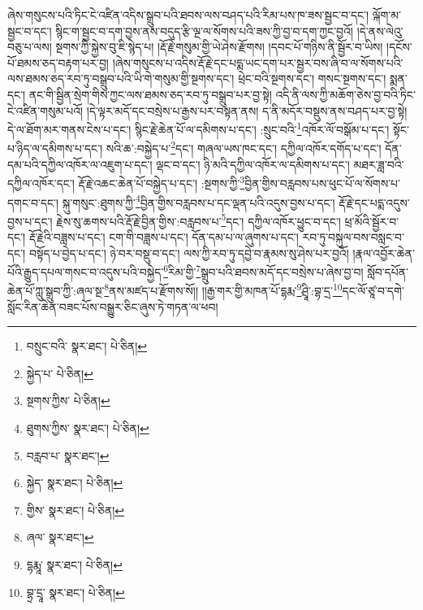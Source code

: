ཞེས་གསུངས་པའི་ཏིང་ངེ་འཛིན་འདིས་སྒྲུབ་པའི་ཐབས་ལས་བཤད་པའི་རིམ་པས་ཁ་ཟས་སྦྱང་བ་དང་། ལྐོག་མ་སྦྱང་བ་དང་། སྙིང་ག་སྦྱང་བ་དག་བྱས་ནས་བདུད་རྩི་ལྔ་ལ་སོགས་པའི་ཟས་ཀྱི་བྱ་བ་དག་ཀྱང་བྱའོ། །དེ་ནས་ལེའུ་བཅུ་པ་ལས། སྔགས་ཀྱི་སྐྱེས་བུ་ཇི་སྙེད་པ། །རྡོ་རྗེ་གསུམ་གྱི་ཡེ་ཤེས་རྫོགས། །དབང་པོ་གཉིས་ནི་སྦྱོར་བ་ཡིས། །དངོས་པོ་ཐམས་ཅད་བརྟག་པར་བྱ། །ཞེས་གསུངས་པ་འདིས་རྡོ་རྗེ་དང་པདྨ་ཡང་དག་པར་སྦྱར་བས་ཞི་བ་ལ་སོགས་པའི་ལས་ཐམས་ཅད་རབ་ཏུ་བསྒྲུབ་པའི་ཡི་གེ་གསུམ་གྱི་སྔགས་དང་། ཕྲེང་བའི་སྔགས་དང་། གསང་སྔགས་དང་། སྨན་དང་། ནང་གི་སྦྱིན་སྲེག་གིས་ཀྱང་ལས་ཐམས་ཅད་རབ་ཏུ་བསྒྲུབ་པར་བྱ་སྟེ། འདི་ནི་ལས་ཀྱི་མཆོག་ཅེས་བྱ་བའི་ཏིང་ངེ་འཛིན་གསུམ་པའོ། །དེ་ལྟར་མདོ་དང་བསྲེས་པ་རྒྱས་པར་བསྟན་ནས། ད་ནི་མདོར་བསྡུས་ནས་བཤད་པར་བྱ་སྟེ། དེ་ལ་ཐོག་མར་གནས་ངེས་པ་དང་། སྙིང་རྗེ་ཆེན་པོ་ལ་དམིགས་པ་དང་། :སྲུང་བའི་\footnote{བསྲུང་བའི་  སྣར་ཐང་།  པེ་ཅིན། }འཁོར་ལོ་བསྒོམ་པ་དང་། སྟོང་པ་ཉིད་ལ་དམིགས་པ་དང་། སའི་ཆ་:བསྐྱེད་པ་\footnote{སྐྱེད་པ་  པེ་ཅིན། }དང་། གཞལ་ཡས་ཁང་དང་། དཀྱིལ་འཁོར་དགོད་པ་དང་། དོན་དམ་པའི་དཀྱིལ་འཁོར་ལ་འཇུག་པ་དང་། ལྡང་བ་དང་། ཉི་མའི་དཀྱིལ་འཁོར་ལ་དམིགས་པ་དང་། མཐར་ཟླ་བའི་དཀྱིལ་འཁོར་དང་། རྡོ་རྗེ་འཆང་ཆེན་པོ་བསྐྱེད་པ་དང་། :སྔགས་ཀྱི་\footnote{སྔགས་ཀྱིས་  པེ་ཅིན། }བྱིན་གྱིས་བརླབས་པས་ཕུང་པོ་ལ་སོགས་པ་དགང་བ་དང་། སྐུ་གསུང་:ཐུགས་ཀྱི་\footnote{ཐུགས་ཀྱིས་  སྣར་ཐང་།  པེ་ཅིན། }བྱིན་གྱིས་བརླབས་པ་དང་ལྡན་པའི་འདུས་བྱས་པ་དང་། རྡོ་རྗེ་དང་པདྨ་འདུས་བྱས་པ་དང་། རྗེས་སུ་ཆགས་པའི་རྡོ་རྗེ་བྱིན་གྱིས་:བརླབས་པ་\footnote{བརླབ་པ་  སྣར་ཐང་། }དང་། དཀྱིལ་འཁོར་ཕྱུང་བ་དང་། ཕྲ་མོའི་སྦྱོར་བ་དང་། རྡོ་རྗེའི་བཟླས་པ་དང་། ངག་གི་བཟླས་པ་དང་། དོན་དམ་པ་ལ་ཞུགས་པ་དང་། རབ་ཏུ་བསྐུལ་བས་བསླང་བ་དང་། བསྟོད་པ་བྱེད་པ་དང་། ཉེ་བར་བསྡུ་བ་དང་། ལས་ཀྱི་རབ་ཏུ་དབྱེ་བ་རྣམས་སུ་ཤེས་པར་བྱའོ། །རྣལ་འབྱོར་ཆེན་པོའི་རྒྱུད་དཔལ་གསང་བ་འདུས་པའི་བསྐྱེད་\footnote{སྐྱེད་  སྣར་ཐང་།  པེ་ཅིན། }རིམ་གྱི་\footnote{གྱིས་  སྣར་ཐང་།  པེ་ཅིན། }སྒྲུབ་པའི་ཐབས་མདོ་དང་བསྲེས་པ་ཞེས་བྱ་བ། སློབ་དཔོན་ཆེན་པོ་ཀླུ་སྒྲུབ་ཀྱི་:ཞལ་སྔ་\footnote{ཞལ་  སྣར་ཐང་། }ནས་མཛད་པ་རྫོགས་སོ།། །།རྒྱ་གར་གྱི་མཁན་པོ་དྷརྨ་\footnote{དྷརྨཱ་  སྣར་ཐང་།  པེ་ཅིན། }ཤྲཱི་:བྷ་དྲ་\footnote{བྷྲ་དྲཱ་  སྣར་ཐང་།  པེ་ཅིན། }དང་ལོ་ཙཱ་བ་དགེ་སློང་རིན་ཆེན་བཟང་པོས་བསྒྱུར་ཅིང་ཞུས་ཏེ་གཏན་ལ་ཕབ། 